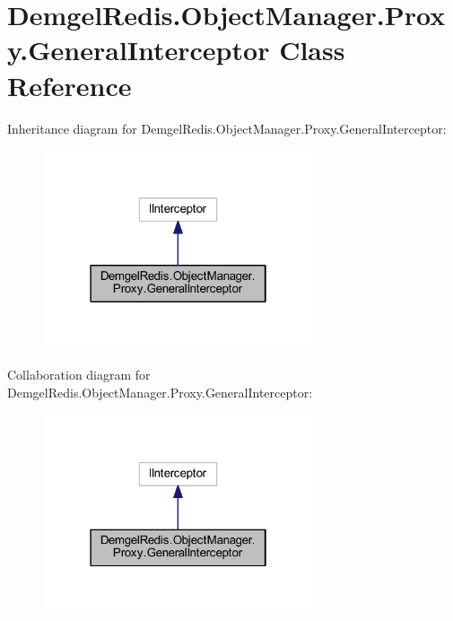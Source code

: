 \hypertarget{class_demgel_redis_1_1_object_manager_1_1_proxy_1_1_general_interceptor}{}\section{Demgel\+Redis.\+Object\+Manager.\+Proxy.\+General\+Interceptor Class Reference}
\label{class_demgel_redis_1_1_object_manager_1_1_proxy_1_1_general_interceptor}


Inheritance diagram for Demgel\+Redis.\+Object\+Manager.\+Proxy.\+General\+Interceptor\+:
\nopagebreak
\begin{figure}[H]
\begin{center}
\leavevmode
\includegraphics[width=226pt]{class_demgel_redis_1_1_object_manager_1_1_proxy_1_1_general_interceptor__inherit__graph}
\end{center}
\end{figure}


Collaboration diagram for Demgel\+Redis.\+Object\+Manager.\+Proxy.\+General\+Interceptor\+:
\nopagebreak
\begin{figure}[H]
\begin{center}
\leavevmode
\includegraphics[width=226pt]{class_demgel_redis_1_1_object_manager_1_1_proxy_1_1_general_interceptor__coll__graph}
\end{center}
\end{figure}

